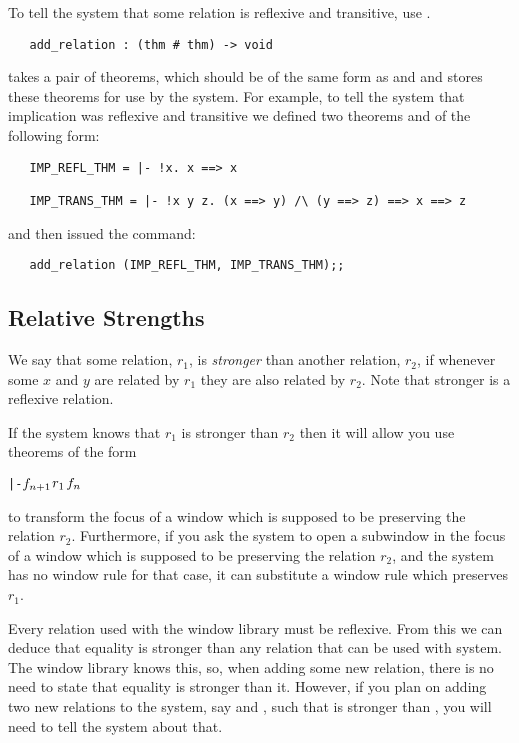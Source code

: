 To tell the system that some relation is reflexive and transitive, use
.
\begin{boxed}\begin{verbatim}
   add_relation : (thm # thm) -> void
\end{verbatim}\end{boxed}
 takes a pair of theorems, which should be of the same form
as  and  and stores these theorems for use by
the system.
For example, to tell the system that implication was reflexive and transitive
we defined two theorems
and
of the following form:
\begin{verbatim}
   IMP_REFL_THM = |- !x. x ==> x

   IMP_TRANS_THM = |- !x y z. (x ==> y) /\ (y ==> z) ==> x ==> z
\end{verbatim}
and then issued the command:
\begin{verbatim}
   add_relation (IMP_REFL_THM, IMP_TRANS_THM);;
\end{verbatim}

\subsection{Relative Strengths}

We say that some relation, $r_1$,
is {\it stronger}\/ than another relation, $r_2$, 
if whenever some $x$ and $y$ are related by $r_1$
they are also related by $r_2$.
Note that stronger is a reflexive relation.

If the system knows that $r_1$ is stronger than $r_2$ then
it will allow you use theorems of the form 
\begin{alltt}
   |- \(f\sb{n+1}\) \(r\sb{1}\) \(f\sb{n}\)
\end{alltt}
to transform the focus of a window which is supposed to be preserving
the relation $r_2$.
Furthermore, if you ask the system to open a subwindow 
in the focus of a window which is supposed to be preserving the relation
$r_2$, and the system has no window rule for that case, it can substitute
a window rule which preserves $r_1$.

Every relation used with the window library must be reflexive.
From this we can deduce that equality is stronger than any relation that can be
used with system.
The window library knows this, so,
when adding some new relation,
there is no need to state that equality is stronger than it.
However, if you plan on adding two new relations to the system,
say  and , such that  is stronger than ,
you will need to tell the system about that.

